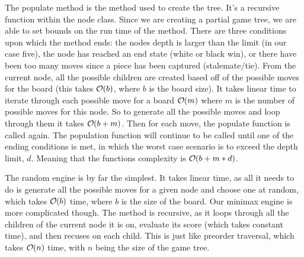 \documentclass[12pt]{article}
\DeclareRobustCommand{\bigO}{
  \text{\usefont{OMS}{cmsy}{m}{n}O}
}
\begin{document}
The populate method is the method used to create the tree. It’s a recursive function within the node class. Since we are creating a partial game tree, we are able to set bounds on the run time of the method. There are three conditions upon which the method ends: the nodes depth is larger than the limit (in our case five), the node has reached an end state (white or black win), or there have been too many moves since a piece has been captured (stalemate/tie). From the current node, all the possible children are created based off of the possible moves for the board (this takes $\bigO(b)$, where $b$ is the board size). It takes linear time to iterate through each possible move for a board $\bigO(m)$ where $m$ is the number of possible moves for this node. So to generate all the possible moves and loop through them it takes $\bigO(b + m)$. Then for each move, the populate function is called again. The population function will continue to be called until one of the ending conditions is met, in which the worst case scenario is to exceed the depth limit, $d$. Meaning that the functions complexity is $\bigO(b+m*d)$.\par
The random engine is by far the simplest. It takes linear time, as all it needs to do is generate all the possible moves for a given node and choose one at random, which takes $\bigO(b)$ time, where $b$ is the size of the board. Our minimax engine is more complicated though. The method is recursive, as it loops through all the children of the current node it is on, evaluate its score (which takes constant time), and then recuses on each child. This is just like preorder traversal, which takes $\bigO(n)$ time, with $n$ being the size of the game tree.\par
\end{document}
